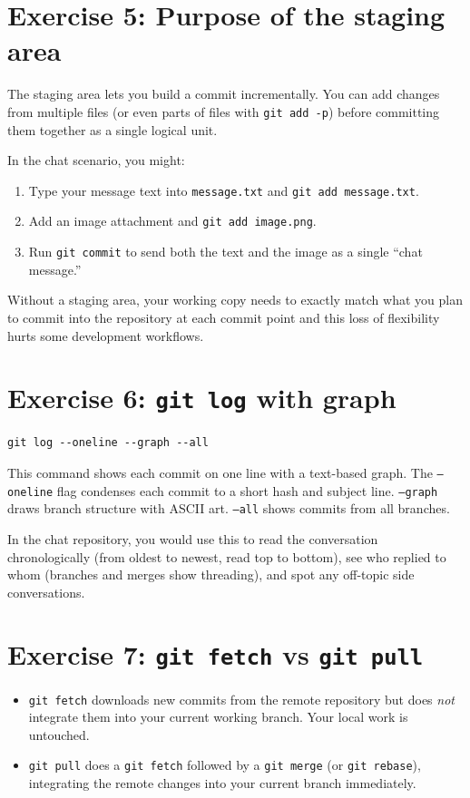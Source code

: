 \documentclass[twoside=false,DIV=14]{scrartcl}
\begin{document}
\section*{Exercise 5: Purpose of the staging area}

The staging area lets you build a commit incrementally.  You can add changes from multiple files (or even parts of files with \texttt{git add -p}) before committing them together as a single logical unit.

In the chat scenario, you might:
\begin{enumerate}
\item Type your message text into \texttt{message.txt} and \texttt{git add message.txt}.
\item Add an image attachment and \texttt{git add image.png}.
\item Run \texttt{git commit} to send both the text and the image as a single ``chat message.''
\end{enumerate}
Without a staging area, your working copy needs to exactly match what you plan to commit into the repository at each commit point and this loss of flexibility hurts some development workflows.
\section*{Exercise 6: \texttt{git log} with graph}

\begin{lstlisting}
git log --oneline --graph --all
\end{lstlisting}

This command shows each commit on one line with a text-based graph.  The \texttt{--oneline} flag condenses each commit to a short hash and subject line.  \texttt{--graph} draws branch structure with ASCII art.  \texttt{--all} shows commits from all branches.

In the chat repository, you would use this to read the conversation chronologically (from oldest to newest, read top to bottom), see who replied to whom (branches and merges show threading), and spot any off-topic side conversations.

\section*{Exercise 7: \texttt{git fetch} vs \texttt{git pull}}

\begin{itemize}
    \item \texttt{git fetch} downloads new commits from the remote repository but does \emph{not} integrate them into your current working branch.  Your local work is untouched.
    \item \texttt{git pull} does a \texttt{git fetch} followed by a \texttt{git merge} (or \texttt{git rebase}), integrating the remote changes into your current branch immediately.
\end{itemize}
\end{document}
